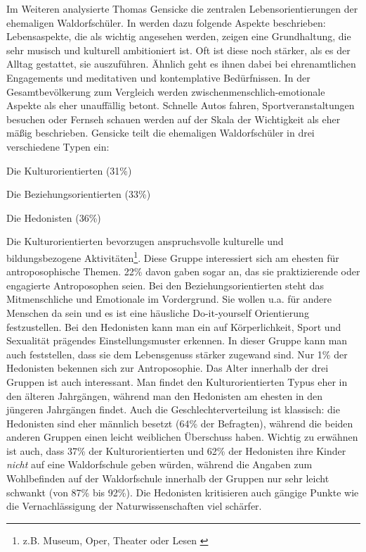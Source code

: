 Im Weiteren analysierte Thomas Gensicke die zentralen Lebensorientierungen der ehemaligen Waldorfschüler. In \citet[][S. 17ff]{randoll07} werden dazu folgende Aspekte beschrieben: Lebensaspekte, die als wichtig angesehen werden, zeigen eine Grundhaltung, die sehr musisch und kulturell ambitioniert ist. Oft ist diese noch stärker, als es der Alltag gestattet, sie auszuführen. Ähnlich geht es ihnen dabei bei ehrenamtlichen Engagements und meditativen und kontemplative Bedürfnissen. In der Gesamtbevölkerung zum Vergleich werden zwischenmenschlich-emotionale Aspekte als eher unauffällig betont. Schnelle Autos fahren, Sportveranstaltungen besuchen oder Fernseh schauen werden auf der Skala der Wichtigkeit als eher mäßig  beschrieben. Gensicke teilt die ehemaligen Waldorfschüler in drei verschiedene Typen ein: 
	\begin{compactitem}
		\item Die Kulturorientierten (31\%)
		\item Die Beziehungsorientierten (33\%)
		\item Die Hedonisten (36\%)
	\end{compactitem}
Die Kulturorientierten bevorzugen anspruchsvolle kulturelle und bildungsbezogene Aktivitäten\footnote{z.B. Museum, Oper, Theater oder Lesen \citep[Vgl.][S. 17]{randoll07}}. Diese Gruppe interessiert sich am ehesten für antroposophische Themen. 22\% davon gaben sogar an, das sie praktizierende oder engagierte Antroposophen seien. Bei den Beziehungsorientierten steht das Mitmenschliche und Emotionale im Vordergrund. Sie wollen u.a. für andere Menschen da sein und es ist eine häusliche Do-it-yourself Orientierung festzustellen. Bei den Hedonisten kann man ein auf Körperlichkeit, Sport und Sexualität prägendes Einstellungsmuster erkennen. In dieser Gruppe kann man auch feststellen, dass sie dem Lebensgenuss stärker zugewand sind. Nur 1\% der Hedonisten bekennen sich zur Antroposophie. Das Alter innerhalb der drei Gruppen ist auch interessant. Man findet den Kulturorientierten Typus eher in den älteren Jahrgängen, während man den Hedonisten am ehesten in den jüngeren Jahrgängen findet. Auch die Geschlechterverteilung ist klassisch: die Hedonisten sind eher männlich besetzt (64\% der Befragten), während die beiden anderen Gruppen einen leicht weiblichen Überschuss haben. Wichtig zu erwähnen ist auch, dass 37\% der Kulturorientierten und 62\% der Hedonisten ihre Kinder \emph{nicht} auf eine Waldorfschule geben würden, während die Angaben zum Wohlbefinden auf der Waldorfschule innerhalb der Gruppen nur sehr leicht schwankt (von 87\% bis 92\%). Die Hedonisten kritisieren auch gängige Punkte wie die Vernachlässigung der Naturwissenschaften viel schärfer. 

